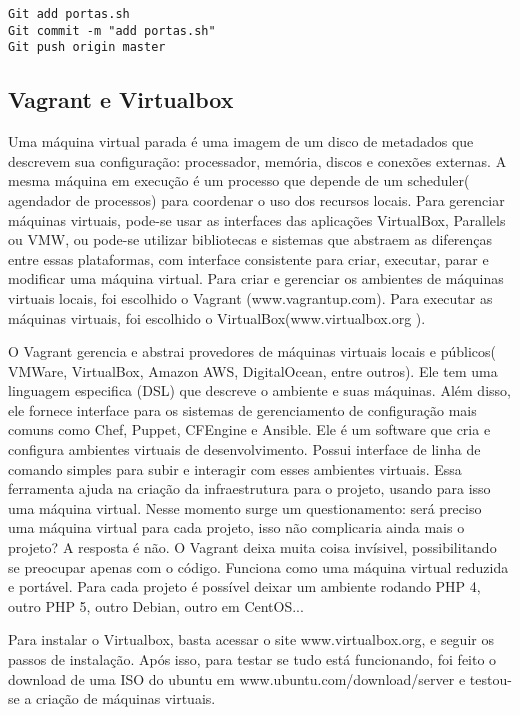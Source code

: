      \begin{lstlisting}
Git add portas.sh
Git commit -m "add portas.sh"
Git push origin master
    \end{lstlisting}
 
\subsection{Vagrant e Virtualbox}

Uma máquina virtual parada é uma imagem de um disco 
de metadados que descrevem sua configuração: processador, 
memória, discos e conexões externas. A mesma máquina em 
execução é um processo que depende de um scheduler( agendador 
de processos) para coordenar o uso dos recursos locais. Para 
gerenciar máquinas virtuais, pode-se usar as interfaces das 
aplicações VirtualBox, Parallels ou VMW, ou pode-se utilizar 
bibliotecas e sistemas que abstraem as diferenças entre 
essas plataformas, com interface consistente para criar, 
executar, parar e modificar uma máquina virtual.
Para criar e gerenciar os ambientes de máquinas virtuais 
locais, foi escolhido o Vagrant (www.vagrantup.com). 
Para executar as máquinas virtuais, foi escolhido o 
VirtualBox(www.virtualbox.org ).

O Vagrant gerencia e abstrai provedores de máquinas 
virtuais locais e públicos( VMWare, VirtualBox, Amazon 
AWS, DigitalOcean, entre outros). Ele tem uma linguagem 
especifica (DSL) que descreve o ambiente e suas máquinas. 
Além disso, ele fornece interface para os sistemas de 
gerenciamento de configuração mais comuns como Chef, 
Puppet, CFEngine e Ansible. Ele é um software que cria e 
configura ambientes 
virtuais de desenvolvimento. Possui interface de 
linha de comando simples para subir e interagir 
com esses ambientes virtuais. Essa ferramenta ajuda na 
criação da infraestrutura para o projeto, usando para 
isso uma máquina virtual. Nesse momento surge um questionamento: 
será preciso uma máquina virtual para cada projeto, isso não 
complicaria ainda mais o projeto? A resposta é não. O Vagrant 
deixa muita coisa invísivel, possibilitando se preocupar apenas 
com o código. Funciona como uma máquina virtual reduzida e 
portável. Para cada projeto é possível deixar 
um ambiente rodando PHP 4, outro PHP 5, outro Debian, outro em 
CentOS...

Para instalar o Virtualbox, basta acessar o site  
www.virtualbox.org, e seguir os passos de instalação. Após isso, 
para testar se tudo está funcionando, foi feito o download de 
uma ISO do ubuntu em www.ubuntu.com/download/server e testou-se 
a criação de máquinas virtuais.

